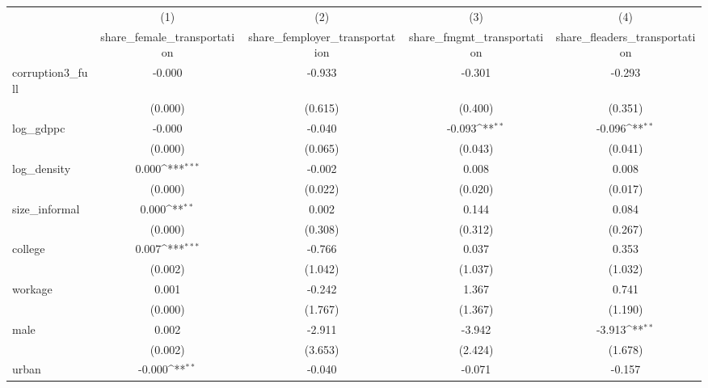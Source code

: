 {
\def\sym#1{\ifmmode^{#1}\else\(^{#1}\)\fi}
\begin{tabular}{l*{4}{c}}
\hline\hline
            &\multicolumn{1}{c}{(1)}&\multicolumn{1}{c}{(2)}&\multicolumn{1}{c}{(3)}&\multicolumn{1}{c}{(4)}\\
            &\multicolumn{1}{c}{share\_female\_transportation}&\multicolumn{1}{c}{share\_femployer\_transportation}&\multicolumn{1}{c}{share\_fmgmt\_transportation}&\multicolumn{1}{c}{share\_fleaders\_transportation}\\
\hline
corruption3\_full&      -0.000         &      -0.933         &      -0.301         &      -0.293         \\
            &     (0.000)         &     (0.615)         &     (0.400)         &     (0.351)         \\
[1em]
log\_gdppc   &      -0.000         &      -0.040         &      -0.093\sym{**} &      -0.096\sym{**} \\
            &     (0.000)         &     (0.065)         &     (0.043)         &     (0.041)         \\
[1em]
log\_density &       0.000\sym{***}&      -0.002         &       0.008         &       0.008         \\
            &     (0.000)         &     (0.022)         &     (0.020)         &     (0.017)         \\
[1em]
size\_informal&       0.000\sym{**} &       0.002         &       0.144         &       0.084         \\
            &     (0.000)         &     (0.308)         &     (0.312)         &     (0.267)         \\
[1em]
college     &       0.007\sym{***}&      -0.766         &       0.037         &       0.353         \\
            &     (0.002)         &     (1.042)         &     (1.037)         &     (1.032)         \\
[1em]
workage     &       0.001         &      -0.242         &       1.367         &       0.741         \\
            &     (0.000)         &     (1.767)         &     (1.367)         &     (1.190)         \\
[1em]
male        &       0.002         &      -2.911         &      -3.942         &      -3.913\sym{**} \\
            &     (0.002)         &     (3.653)         &     (2.424)         &     (1.678)         \\
[1em]
urban       &      -0.000\sym{**} &      -0.040         &      -0.071         &      -0.157         \\

\end{tabular}}
